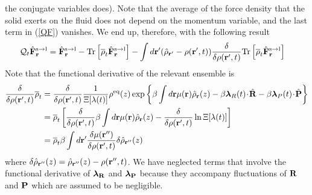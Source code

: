 \documentclass[b5paper,openright,11pt]{book}
\newcommand{\esc}{\!\cdot\!}
\begin{document}
\begin{appendices}
the  conjugate  variables does).   
Note that the average  of the force density  that the solid exerts  on the fluid
does  not depend  on  the  momentum variable,  and  the  last term  in
(\ref{QF}) vanishes. We end up, therefore, with the following result
\begin{align}
  {\cal Q}_t\hat{\bf F}^{\rm s\to l}_{{\bf r}}&=
\hat{\bf F}^{\rm s\to l}_{{\bf r}}- {\rm Tr}\left[\overline{\rho}_{t} \hat{\bf F}^{\rm s\to l}_{{\bf r}}\right]
-\int d{\bf r}'(\hat{\rho}_{{\bf r}'}-\rho({\bf r}',t))
\frac{\delta}{\delta \rho({\bf r}',t)}{\rm Tr}\left[\overline{\rho}_{t} \hat{\bf F}^{\rm s\to l}_{{\bf r}}\right]
\label{QF1}
\end{align}
Note that the functional derivative of the relevant ensemble is
\begin{align}
\frac{\delta}{\delta {\rho}({\bf r}',t)}\overline{\rho}_{t} &=
\frac{\delta}{\delta {\rho}({\bf r}',t)}
\frac{1}{\Xi[\lambda(t)]}   \rho^{\rm eq}(z)
\exp\left\{\beta\int d{\bf r}\mu({\bf r})\hat{\rho}_{\bf r}(z)
-\beta \boldsymbol{\lambda}_{R}(t)\esc\hat{\bf R}
-\beta \boldsymbol{\lambda}_{P}(t)\esc\hat{\bf P}\right\}
\nonumber\\
&=
\overline{\rho}_{t}\left[\frac{\delta}{\delta {\rho}({\bf r}',t)}\beta \int d{\bf r}\mu({\bf r})\hat{\rho}_{\bf r}(z)-\frac{\delta}{\delta{\rho}({\bf r}',t)}\ln \Xi[\lambda(t)]\right]
\nonumber\\
&=
\overline{\rho}_{t}\beta \int d{\bf r}'\frac{\delta \mu({\bf r}'')}{\delta {\rho}({\bf r}',t)}\delta\hat{\rho}_{{\bf r}''}(z)
\label{funcder}
\end{align}
where $\delta\hat{\rho}_{{\bf r}''}(z)=\hat{\rho}_{{\bf r}''}(z)-\rho({\bf r}'',t)$.
We have neglected terms that involve the functional derivative of $\boldsymbol{\lambda}_{\bf R}$ and $\boldsymbol{\lambda}_{\bf P}$ because they accompany fluctuations of ${\bf R}$ and ${\bf P}$ which are assumed to be negligible.


\end{appendices}
\end{document}
